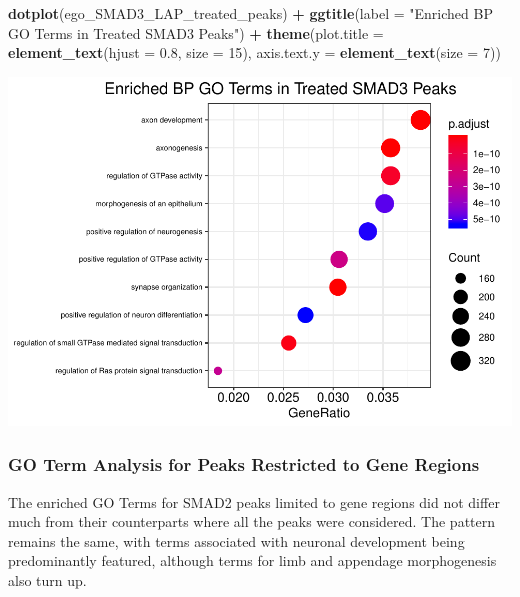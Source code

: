 \documentclass[]{article}
\newenvironment{Shaded}{\begin{snugshade}}{\end{snugshade}}
\newcommand{\DataTypeTok}[1]{\textcolor[rgb]{0.13,0.29,0.53}{#1}}
\newcommand{\DecValTok}[1]{\textcolor[rgb]{0.00,0.00,0.81}{#1}}
\newcommand{\FloatTok}[1]{\textcolor[rgb]{0.00,0.00,0.81}{#1}}
\newcommand{\KeywordTok}[1]{\textcolor[rgb]{0.13,0.29,0.53}{\textbf{#1}}}
\newcommand{\NormalTok}[1]{#1}
\newcommand{\OperatorTok}[1]{\textcolor[rgb]{0.81,0.36,0.00}{\textbf{#1}}}
\newcommand{\StringTok}[1]{\textcolor[rgb]{0.31,0.60,0.02}{#1}}
\begin{document}
\clearpage{}

\begin{Shaded}
\begin{Highlighting}[]
\KeywordTok{dotplot}\NormalTok{(ego_SMAD3_LAP_treated_peaks) }\OperatorTok{+}\StringTok{ }\KeywordTok{ggtitle}\NormalTok{(}\DataTypeTok{label =} \StringTok{"Enriched BP GO Terms in Treated SMAD3 Peaks"}\NormalTok{) }\OperatorTok{+}\StringTok{ }\KeywordTok{theme}\NormalTok{(}\DataTypeTok{plot.title =} \KeywordTok{element_text}\NormalTok{(}\DataTypeTok{hjust =} \FloatTok{0.8}\NormalTok{, }\DataTypeTok{size =} \DecValTok{15}\NormalTok{), }\DataTypeTok{axis.text.y =} \KeywordTok{element_text}\NormalTok{(}\DataTypeTok{size =} \DecValTok{7}\NormalTok{))}
\end{Highlighting}
\end{Shaded}

\includegraphics{peak_annotation_go_term_analysis_files/figure-latex/unnamed-chunk-19-1.pdf}

\clearpage{}

\subsubsection{GO Term Analysis for Peaks Restricted to Gene Regions}

The enriched GO Terms for SMAD2 peaks limited to gene regions did not
differ much from their counterparts where all the peaks were considered.
The pattern remains the same, with terms associated with neuronal
development being predominantly featured, although terms for limb and
appendage morphogenesis also turn up.
\end{document}

